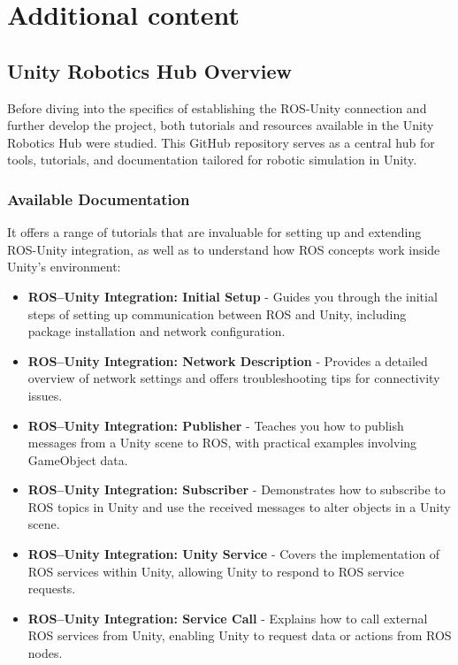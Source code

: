 \chapter{Additional content}


\section{Unity Robotics Hub Overview}

    Before diving into the specifics of establishing the ROS-Unity connection and further develop the project, both tutorials and resources available 
    in the Unity Robotics Hub were studied. This GitHub repository serves as a central hub for tools, tutorials, and documentation tailored for robotic 
    simulation in Unity.

    \subsection{Available Documentation}

    It offers a range of tutorials that are invaluable for setting up and extending ROS-Unity integration, as well as to understand how ROS concepts work inside Unity's environment:
    
    \begin{itemize}
        \item \textbf{ROS–Unity Integration: Initial Setup} - Guides you through the initial steps of setting up communication between ROS and Unity, including package installation and network configuration.
        
        \item \textbf{ROS–Unity Integration: Network Description} - Provides a detailed overview of network settings and offers troubleshooting tips for connectivity issues.
        
        \item \textbf{ROS–Unity Integration: Publisher} - Teaches you how to publish messages from a Unity scene to ROS, with practical examples involving GameObject data.
        
        \item \textbf{ROS–Unity Integration: Subscriber} - Demonstrates how to subscribe to ROS topics in Unity and use the received messages to alter objects in a Unity scene.
        
        \item \textbf{ROS–Unity Integration: Unity Service} - Covers the implementation of ROS services within Unity, allowing Unity to respond to ROS service requests.
        
        \item \textbf{ROS–Unity Integration: Service Call} - Explains how to call external ROS services from Unity, enabling Unity to request data or actions from ROS nodes.
    \end{itemize}
    
